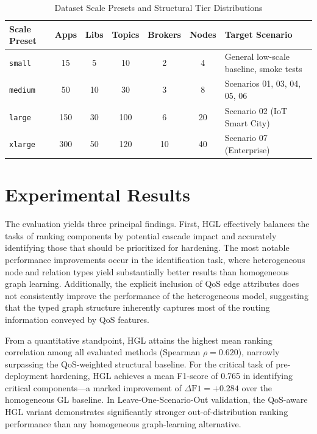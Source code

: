 \documentclass[sigconf,9pt,anonymous]{acmart}
\begin{document}
\begin{table}[t]
\centering
\caption{Dataset Scale Presets and Structural Tier Distributions}
\label{tab:dataset_scales}
\small
\begin{tabularx}{\columnwidth}{l c c c c c l}
\toprule
\textbf{Scale Preset} & \textbf{Apps} & \textbf{Libs} & \textbf{Topics} & \textbf{Brokers} & \textbf{Nodes} & \textbf{Target Scenario} \\
\midrule
\texttt{small}  & 15  & 5   & 10  & 2  & 4  & General low-scale baseline, smoke tests \\
\texttt{medium} & 50  & 10  & 30  & 3  & 8  & Scenarios 01, 03, 04, 05, 06 \\
\texttt{large}  & 150 & 30  & 100 & 6  & 20 & Scenario 02 (IoT Smart City) \\
\texttt{xlarge}  & 300 & 50  & 120 & 10 & 40 & Scenario 07 (Enterprise) \\
\bottomrule
\end{tabularx}
\vspace{1pt}
\begin{minipage}{\columnwidth}
\end{minipage}
\end{table}

\section{Experimental Results}

The evaluation yields three principal findings. First, HGL effectively balances the tasks of ranking components by potential cascade impact and accurately identifying those that should be prioritized for hardening. The most notable performance improvements occur in the identification task, where heterogeneous node and relation types yield substantially better results than homogeneous graph learning. Additionally, the explicit inclusion of QoS edge attributes does not consistently improve the performance of the heterogeneous model, suggesting that the typed graph structure inherently captures most of the routing information conveyed by QoS features.

From a quantitative standpoint, HGL attains the highest mean ranking correlation among all evaluated methods (Spearman $\rho=0.620$), narrowly surpassing the QoS-weighted structural baseline. For the critical task of pre-deployment hardening, HGL achieves a mean F1-score of 0.765 in identifying critical components—a marked improvement of $\Delta\text{F1}=+0.284$ over the homogeneous GL baseline. In Leave-One-Scenario-Out validation, the QoS-aware HGL variant demonstrates significantly stronger out-of-distribution ranking performance than any homogeneous graph-learning alternative.
\end{document}
